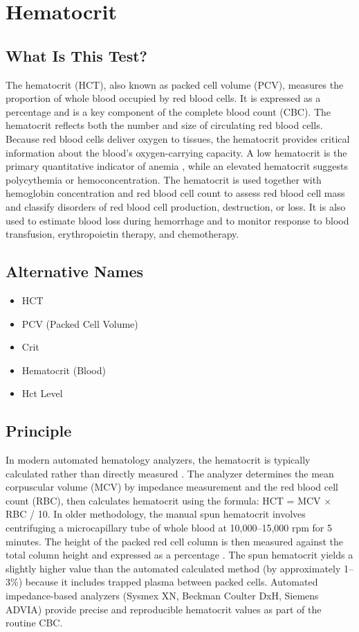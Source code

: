 \chapter{Hematocrit}

\section*{What Is This Test?}
The hematocrit (HCT), also known as packed cell volume (PCV), measures the proportion of whole blood occupied by red blood cells. It is expressed as a percentage and is a key component of the complete blood count (CBC). The hematocrit reflects both the number and size of circulating red blood cells. Because red blood cells deliver oxygen to tissues, the hematocrit provides critical information about the blood's oxygen-carrying capacity. A low hematocrit is the primary quantitative indicator of anemia \cite{who2011haemoglobin}, while an elevated hematocrit suggests polycythemia or hemoconcentration. The hematocrit is used together with hemoglobin concentration and red blood cell count to assess red blood cell mass and classify disorders of red blood cell production, destruction, or loss. It is also used to estimate blood loss during hemorrhage and to monitor response to blood transfusion, erythropoietin therapy, and chemotherapy.

\section*{Alternative Names}
\begin{itemize}
  \item HCT
  \item PCV (Packed Cell Volume)
  \item Crit
  \item Hematocrit (Blood)
  \item Hct Level
\end{itemize}
\section*{Principle}
In modern automated hematology analyzers, the hematocrit is typically calculated rather than directly measured \cite{tietz2023textbook}. The analyzer determines the mean corpuscular volume (MCV) by impedance measurement and the red blood cell count (RBC), then calculates hematocrit using the formula: HCT = MCV $\times$ RBC / 10. In older methodology, the manual spun hematocrit involves centrifuging a microcapillary tube of whole blood at 10,000--15,000 rpm for 5 minutes. The height of the packed red cell column is then measured against the total column height and expressed as a percentage \cite{bain2017dacie}. The spun hematocrit yields a slightly higher value than the automated calculated method (by approximately 1--3\%) because it includes trapped plasma between packed cells. Automated impedance-based analyzers (Sysmex XN, Beckman Coulter DxH, Siemens ADVIA) provide precise and reproducible hematocrit values as part of the routine CBC.

